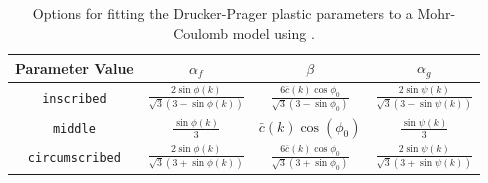 \begin{table}
\caption{Options for fitting the Drucker-Prager plastic parameters to a Mohr-Coulomb model using .}
\label{tab:fit_mohr_coulomb}
\begin{tabular}{cccc}
\textbf{Parameter Value} & $\alpha_{f}$ & $\beta$ & $\alpha_{g}$\\
\hline 
\texttt{inscribed} & $\frac{2\sin\phi\left(k\right)}{\sqrt{3}\left(3-\sin\phi\left(k\right)\right)}$ & $\frac{6\bar{c}\left(k\right)\cos\phi_{0}}{\sqrt{3}\left(3-\sin\phi_{0}\right)}$ & $\frac{2\sin\psi(k)}{\sqrt{3}\left(3-\sin\psi\left(k\right)\right)}$\\
\hline 
\texttt{middle} & $\frac{\sin\phi\left(k\right)}{3}$ & $\bar{c}\left(k\right)\cos\left(\phi_{0}\right)$ & $\frac{\sin\psi\left(k\right)}{3}$\\
\hline 
\texttt{circumscribed} & $\frac{2\sin\phi\left(k\right)}{\sqrt{3}\left(3+\sin\phi\left(k\right)\right)}$ & $\frac{6\bar{c}\left(k\right)\cos\phi_{0}}{\sqrt{3}\left(3+\sin\phi_{0}\right)}$ & $\frac{2\sin\psi(k)}{\sqrt{3}\left(3+\sin\psi\left(k\right)\right)}$\\
\hline 
\end{tabular}
\end{table}

